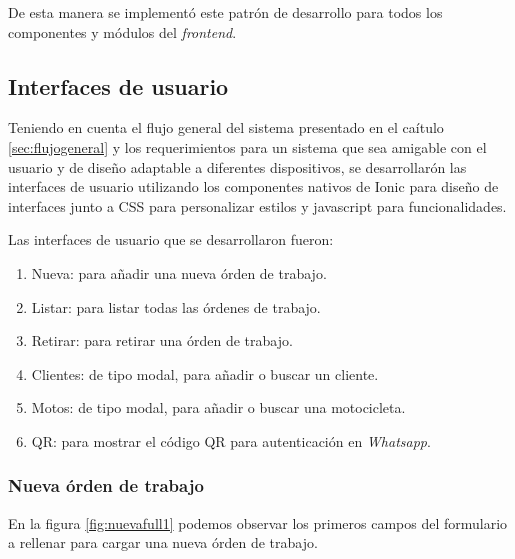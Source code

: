 De esta manera se implementó este patrón de desarrollo para todos los componentes y módulos del \textit{frontend}.

\subsection{Interfaces de usuario}
\label{subsec:frontinterfaces}

Teniendo en cuenta el flujo general del sistema presentado en el caítulo \ref{sec:flujogeneral} y los requerimientos para un sistema que sea amigable con el usuario y de diseño adaptable a diferentes dispositivos, se desarrollarón las interfaces de usuario utilizando los componentes nativos de Ionic para diseño de interfaces junto a CSS para personalizar estilos y javascript para funcionalidades. 

Las interfaces de usuario que se desarrollaron fueron:

\begin{enumerate}
\item Nueva: para añadir una nueva órden de trabajo.
\item Listar: para listar todas las órdenes de trabajo.
\item Retirar: para retirar una órden de trabajo.
\item Clientes: de tipo modal, para añadir o buscar un cliente.
\item Motos: de tipo modal, para añadir o buscar una motocicleta.
\item QR: para mostrar el código QR para autenticación en \textit{Whatsapp}.
\end{enumerate}

\subsubsection{Nueva órden de trabajo}
\label{subsubsec:frontnuevaorden}
En la figura \ref{fig:nuevafull1} podemos observar los primeros campos del formulario a rellenar para cargar una nueva órden de trabajo.

